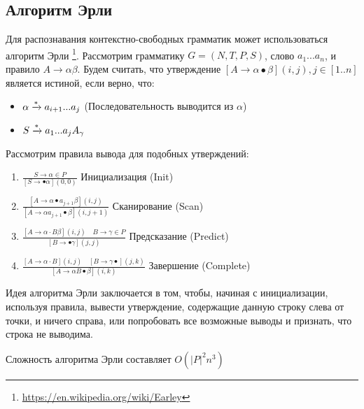 \subsection{Алгоритм Эрли}
Для распознавания контекстно-свободных грамматик может использоваться алгоритм Эрли\cite{Earley} \footnote{\url{https://en.wikipedia.org/wiki/Earley}}.
Рассмотрим грамматику $G=(N,T,P,S)$, слово $a_1...a_n$,
и правило $A \rightarrow \alpha\beta$. Будем считать, что утверждение
$[A\rightarrow \alpha \bullet \beta](i,j), j \in [1..n]$ является истиной, если верно, что:
\begin{itemize}
	\item $\alpha \xrightarrow{\smash{*}} a_{i+1}...a_j$ (Последовательность выводится из $\alpha$)
	\item $S \xrightarrow{\smash{*}} a_1...a_jA_\gamma$ 
\end{itemize}


Рассмотрим правила вывода для подобных утверждений:

\begin{enumerate}
	\item $\frac{S \rightarrow \alpha \in P}{[S \rightarrow \bullet \alpha](0,0)}$ Инициализация (Init)
	
	\item $\frac{\left[A \rightarrow \alpha \bullet a_{j+1} \beta\right](i, j)}{\left[A \rightarrow \alpha a_{j+1} \bullet \beta\right](i, j+1)}$ Сканирование (Scan)
	
	\item $\frac{[A \rightarrow \alpha \cdot B \beta](i, j) \quad B \rightarrow \gamma \in P}{[B \rightarrow \bullet \gamma](j, j)}$ Предсказание (Predict)
	
	\item $\frac{[A \rightarrow \alpha \cdot B](i, j) \quad[B \rightarrow \gamma \bullet](j, k)}{[A \rightarrow \alpha B \bullet \beta](i, k)}$ Завершение (Complete)
	
\end{enumerate}

Идея алгоритма Эрли заключается в том, чтобы, начиная с инициализации, используя правила, вывести утверждение, содержащие данную строку слева от точки, и ничего справа, или попробовать все возможные выводы и признать, что строка не выводима.

Сложность алгоритма Эрли составляет $O(|P|^2n^3)$

